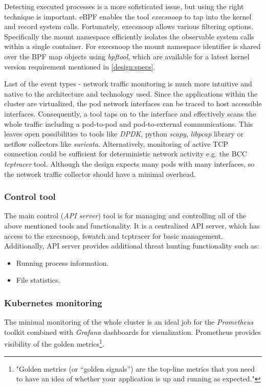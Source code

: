 Detecting executed processes is a more sofisticated issue, but using the right technique is important. eBPF enables the tool \textit{execsnoop} to tap into the kernel and record system calls. Fortunately, execsnoop allows various filtering options. Specifically the mount namespace efficiently isolates the observable system calls within a single container. For execsnoop the mount namespace identifier is shared over the BPF map objects using \textit{bpftool}, which are available for a latest kernel version requirement mentioned in \autoref{design:specs}.

Last of the event types - network traffic monitoring is much more intuitive and native to the architecture and technology used. Since the applications within the cluster are virtualized, the pod network interfaces can be traced to host accessible interfaces. Consequently, a tool taps on to the interface and effectively scans the whole traffic including a pod-to-pod and pod-to-external communications. This leaves open possibilities to tools like \textit{DPDK}, python \textit{scapy}, \textit{libpcap} library or netflow collectors like \textit{suricata}. Alternatively, monitoring of active TCP connection could be sufficient for deterministic network activity e.g. the BCC \textit{tcptracer} tool. Although the design expects many pods with many interfaces, so the network traffic collector should have a minimal overhead.

\subsubsection*{Control tool \label{design:mon:tools:main}}
The main control (\textit{API server}) tool is for managing and controlling all of the above mentioned tools and functionality. It is a centralized API server, which has access to the execsnoop, fswatch and tcptracer for basic management. Additionally, API server provides additional threat hunting functionality such as:
\begin{itemize}[noitemsep]
	\item Running process information.
	\item File statistics.
\end{itemize}

\subsubsection*{Kubernetes monitoring \label{design:mon:tools:k8s}}
The minimal monitoring of the whole cluster is an ideal job for the \textit{Prometheus} toolkit combined with \textit{Grafana} dashboards for visualization. Prometheus provides visibility of the golden metrics\footnote{"Golden metrics (or “golden signals”) are the top-line metrics that you need to have an idea of whether your application is up and running as expected."\cite{goldenmetrics}}.

